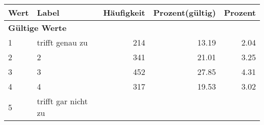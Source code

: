      \begin{longtable}{lXrrr}
     \toprule
     \textbf{Wert} & \textbf{Label} & \textbf{Häufigkeit} & \textbf{Prozent(gültig)} & \textbf{Prozent} \\
     \endhead
     \midrule
     \multicolumn{5}{l}{\textbf{Gültige Werte}}\\

     1 &
     \multicolumn{1}{X}{ trifft genau zu   } &


       \num{214} &
       \num[round-mode=places,round-precision=2]{13.19} &
         \num[round-mode=places,round-precision=2]{2.04} \\

     2 &
     \multicolumn{1}{X}{ 2   } &


       \num{341} &
       \num[round-mode=places,round-precision=2]{21.01} &
         \num[round-mode=places,round-precision=2]{3.25} \\

     3 &
     \multicolumn{1}{X}{ 3   } &


       \num{452} &
       \num[round-mode=places,round-precision=2]{27.85} &
         \num[round-mode=places,round-precision=2]{4.31} \\

     4 &
     \multicolumn{1}{X}{ 4   } &


       \num{317} &
       \num[round-mode=places,round-precision=2]{19.53} &
         \num[round-mode=places,round-precision=2]{3.02} \\

     5 &
     \multicolumn{1}{X}{ trifft gar nicht zu   } &



\end{longtable}
